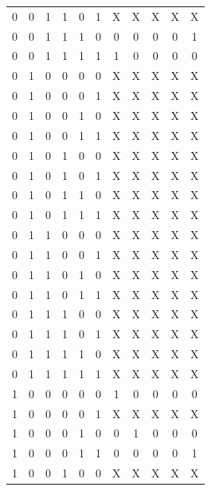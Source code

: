 \documentclass{article}
\begin{document}
\begin{center}
\begin{tabular}{c|c|c|c|c|c|c|c|c|c|c}
        0  &  0  &  1  &  1  &  0  &  1  &  X  &  X  &  X  &  X  &  X \\
        0  &  0  &  1  &  1  &  1  &  0  &  0  &  0  &  0  &  0  &  1 \\
        0  &  0  &  1  &  1  &  1  &  1  &  1  &  0  &  0  &  0  &  0 \\
        0  &  1  &  0  &  0  &  0  &  0  &  X  &  X  &  X  &  X  &  X \\
        0  &  1  &  0  &  0  &  0  &  1  &  X  &  X  &  X  &  X  &  X \\
        0  &  1  &  0  &  0  &  1  &  0  &  X  &  X  &  X  &  X  &  X \\
        0  &  1  &  0  &  0  &  1  &  1  &  X  &  X  &  X  &  X  &  X \\
        0  &  1  &  0  &  1  &  0  &  0  &  X  &  X  &  X  &  X  &  X \\
        0  &  1  &  0  &  1  &  0  &  1  &  X  &  X  &  X  &  X  &  X \\
        0  &  1  &  0  &  1  &  1  &  0  &  X  &  X  &  X  &  X  &  X \\
        0  &  1  &  0  &  1  &  1  &  1  &  X  &  X  &  X  &  X  &  X \\
        0  &  1  &  1  &  0  &  0  &  0  &  X  &  X  &  X  &  X  &  X \\
        0  &  1  &  1  &  0  &  0  &  1  &  X  &  X  &  X  &  X  &  X \\
        0  &  1  &  1  &  0  &  1  &  0  &  X  &  X  &  X  &  X  &  X \\
        0  &  1  &  1  &  0  &  1  &  1  &  X  &  X  &  X  &  X  &  X \\
        0  &  1  &  1  &  1  &  0  &  0  &  X  &  X  &  X  &  X  &  X \\
        0  &  1  &  1  &  1  &  0  &  1  &  X  &  X  &  X  &  X  &  X \\
        0  &  1  &  1  &  1  &  1  &  0  &  X  &  X  &  X  &  X  &  X \\
        0  &  1  &  1  &  1  &  1  &  1  &  X  &  X  &  X  &  X  &  X \\
        1  &  0  &  0  &  0  &  0  &  0  &  1  &  0  &  0  &  0  &  0 \\
        1  &  0  &  0  &  0  &  0  &  1  &  X  &  X  &  X  &  X  &  X \\
        1  &  0  &  0  &  0  &  1  &  0  &  0  &  1  &  0  &  0  &  0 \\
        1  &  0  &  0  &  0  &  1  &  1  &  0  &  0  &  0  &  0  &  1 \\
        1  &  0  &  0  &  1  &  0  &  0  &  X  &  X  &  X  &  X  &  X \\

\end{tabular}
\end{center}
\end{document}

